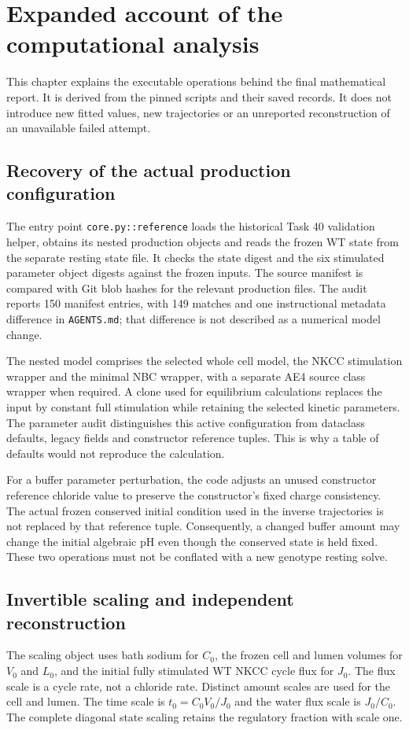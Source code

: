 \section{Expanded account of the computational analysis}
\label{sec:report-methods}
This chapter explains the executable operations behind the final mathematical report. It is derived from the pinned scripts and their saved records. It does not introduce new fitted values, new trajectories or an unreported reconstruction of an unavailable failed attempt.

\subsection{Recovery of the actual production configuration}
The entry point \texttt{core.py::reference} loads the historical Task 40 validation helper, obtains its nested production objects and reads the frozen WT state from the separate resting state file. It checks the state digest and the six stimulated parameter object digests against the frozen inputs. The source manifest is compared with Git blob hashes for the relevant production files. The audit reports 150 manifest entries, with 149 matches and one instructional metadata difference in \texttt{AGENTS.md}; that difference is not described as a numerical model change.

The nested model comprises the selected whole cell model, the NKCC stimulation wrapper and the minimal NBC wrapper, with a separate AE4 source class wrapper when required. A clone used for equilibrium calculations replaces the input by constant full stimulation while retaining the selected kinetic parameters. The parameter audit distinguishes this active configuration from dataclass defaults, legacy fields and constructor reference tuples. This is why a table of defaults would not reproduce the calculation.

For a buffer parameter perturbation, the code adjusts an unused constructor reference chloride value to preserve the constructor's fixed charge consistency. The actual frozen conserved initial condition used in the inverse trajectories is not replaced by that reference tuple. Consequently, a changed buffer amount may change the initial algebraic pH even though the conserved state is held fixed. These two operations must not be conflated with a new genotype resting solve.

\subsection{Invertible scaling and independent reconstruction}
The scaling object uses bath sodium for $C_0$, the frozen cell and lumen volumes for $V_0$ and $L_0$, and the initial fully stimulated WT NKCC cycle flux for $J_0$. The flux scale is a cycle rate, not a chloride rate. Distinct amount scales are used for the cell and lumen. The time scale is $t_0=C_0V_0/J_0$ and the water flux scale is $J_0/C_0$. The complete diagonal state scaling retains the regulatory fraction with scale one.

